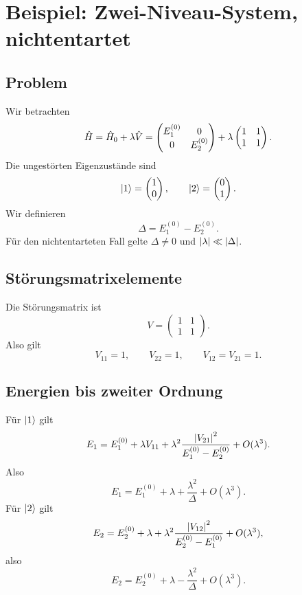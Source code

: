 \section{Beispiel: Zwei-Niveau-System, nichtentartet}

\subsection{Problem}

Wir betrachten
\[
    \hat H=\hat H_0+\lambda\hat V
    =
    \begin{pmatrix}
        E_1^{(0)} & 0\\
        0 & E_2^{(0)}
    \end{pmatrix}
    +\lambda
    \begin{pmatrix}
        1 & 1\\
        1 & 1
    \end{pmatrix}.
\]
Die ungestörten Eigenzustände sind
\[
    \left|1\right\rangle=\begin{pmatrix}1\\0\end{pmatrix},
    \qquad
    \left|2\right\rangle=\begin{pmatrix}0\\1\end{pmatrix}.
\]
Wir definieren
\[
    \Delta=E_1^{(0)}-E_2^{(0)}.
\]
Für den nichtentarteten Fall gelte \(\Delta\neq 0\) und \(\left| \lambda \right|\ll\left| \Delta \right|\).

\subsection{Störungsmatrixelemente}

Die Störungsmatrix ist
\[
    V=\begin{pmatrix}1&1\\1&1\end{pmatrix}.
\]
Also gilt
\[
    V_{11}=1,
    \qquad
    V_{22}=1,
    \qquad
    V_{12}=V_{21}=1.
\]

\subsection{Energien bis zweiter Ordnung}

Für \(\left|1\right\rangle\) gilt
\[
    E_1=E_1^{(0)}+\lambda V_{11}
    +\lambda^2\frac{\left| V_{21} \right|^2}{E_1^{(0)}-E_2^{(0)}}+O(\lambda^3).
\]
Also
\[
    E_1=E_1^{(0)}+\lambda+\frac{\lambda^2}{\Delta}+O(\lambda^3).
\]
Für \(\left|2\right\rangle\) gilt
\[
    E_2=E_2^{(0)}+\lambda+\lambda^2\frac{\left| V_{12} \right|^2}{E_2^{(0)}-E_1^{(0)}}+O(\lambda^3),
\]
also
\[
    E_2=E_2^{(0)}+\lambda-\frac{\lambda^2}{\Delta}+O(\lambda^3).
\]

